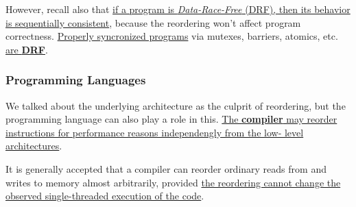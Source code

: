 However, recall also that \ul{if a program is \textit{Data-Race-Free} (DRF), then its behavior is sequentially consistent}, because the reordering won't affect program correctness.
\ul{Properly syncronized programs} via mutexes, barriers, atomics, etc. \ul{are \textbf{DRF}}.



\subsubsection{Programming Languages}
We talked about the underlying architecture as the culprit of reordering, but the programming language can also play a role in this.
\ul{The \textbf{compiler} may reorder instructions for performance reasons independengly from the low-
level architectures}.

It is generally accepted that a compiler can reorder ordinary reads from and writes to memory almost arbitrarily, provided \ul{the reordering cannot change the observed single-threaded execution of the code}.